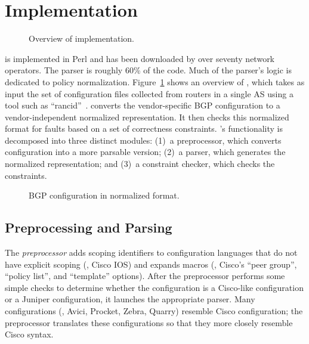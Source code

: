 \section{Implementation}\label{sec:implementation}


\begin{figure}[t]
\centering
%
\caption{Overview of \rcc implementation.}
\label{fig:rolex_design}
\end{figure}

\rcc is implemented in 
Perl and has been downloaded
by over seventy network operators.
The parser is roughly
60\% of the code.  
Much of the parser's logic is dedicated to policy
normalization.  
%
Figure~\ref{fig:rolex_design} shows an overview of \rccns, which 
takes as input the set of configuration files collected from
routers in a single AS
using a tool such as ``rancid''~\cite{www-rancid}.
\rcc
converts the vendor-specific BGP configuration to a vendor-independent
normalized 
representation.  It then checks this normalized format for faults
based on a set of correctness constraints.  
\rccns's functionality is
decomposed into three distinct modules: (1)~a preprocessor, which
converts configuration into a more parsable version; (2)~a parser, which
generates the normalized  representation; and (3)~a constraint checker,
which checks the constraints.  



\begin{figure}[t]
\centering
\hspace*{-0.2in}
\caption{BGP configuration in normalized format.} 
\label{fig:if}
\end{figure}

\subsection{Preprocessing and Parsing}\label{sec:parser}

The {\em preprocessor} adds scoping identifiers to configuration
languages that do not have explicit scoping (\eg, Cisco IOS) and expands
macros (\eg, Cisco's ``peer group'', ``policy list'', and ``template''
options).  After the preprocessor performs some simple checks to
determine whether the configuration is a Cisco-like configuration
or a Juniper configuration, it launches the appropriate parser.  Many
configurations (\eg, Avici, Procket, Zebra, Quarry) resemble Cisco
configuration; the preprocessor translates these configurations so that
they more closely resemble Cisco syntax.

